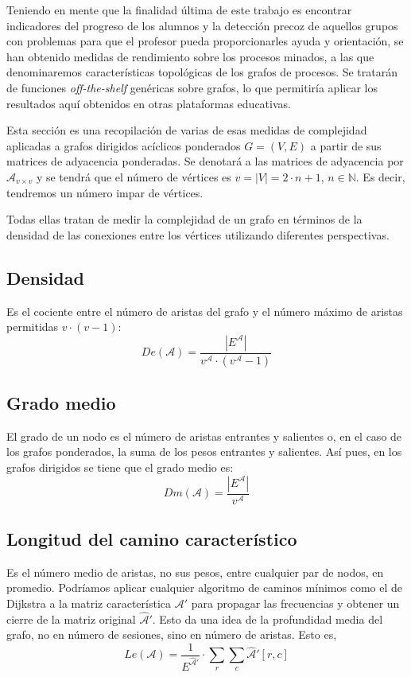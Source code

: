Teniendo en mente que la finalidad última de este trabajo es encontrar indicadores del progreso de los alumnos y la detección precoz de aquellos grupos con problemas para que el profesor pueda proporcionarles ayuda y orientación, se han obtenido medidas de rendimiento sobre los procesos minados, a las que denominaremos características topológicas de los grafos de procesos. Se tratarán de funciones \emph{off-the-shelf} genéricas sobre grafos, lo que permitiría aplicar los resultados aquí obtenidos en otras plataformas educativas.

Esta sección es una recopilación de varias de esas medidas de complejidad \cite{cormen2022introduction} aplicadas a grafos dirigidos acíclicos ponderados $G = (V,E)$ a partir de sus matrices de adyacencia ponderadas. Se denotará a las matrices de adyacencia por $\mathcal{A}_{v\times v}$ y se tendrá que el número de vértices es $v = |V| = 2\cdot n + 1$, $n \in \mathbb{N}$. Es decir, tendremos un número impar de vértices.

Todas ellas tratan de medir la complejidad de un grafo en términos de la densidad de las conexiones entre los vértices utilizando diferentes perspectivas.

\subsection{Densidad}
Es el cociente entre el número de aristas del grafo y el número máximo de aristas permitidas $v \cdot (v-1)$:
\begin{equation}
De(\mathcal{A}) = \frac{|E^{\mathcal{A}}|}{v^{\mathcal{A}}\cdot (v^{\mathcal{A}}-1)}
\end{equation}
\subsection{Grado medio}
El grado de un nodo es el número de aristas entrantes y salientes o, en el caso de los grafos ponderados, la suma de los pesos entrantes y salientes. Así pues, en los grafos dirigidos se tiene que el grado medio es:
\begin{equation}
Dm(\mathcal{A}) = \frac{|E^{\mathcal{A}}|}{v^{\mathcal{A}}}
\end{equation}
\subsection{Longitud del camino característico}
Es el número medio de aristas, no sus pesos, entre cualquier par de nodos, en promedio. Podríamos aplicar cualquier algoritmo de caminos mínimos como el de Dijkstra \cite{cormen2022introduction} a la matriz característica $\mathcal{A}'$ para propagar las frecuencias y obtener un cierre de la matriz original $\hat{\mathcal{A}}'$. Esto da una idea de la profundidad media del grafo, no en número de sesiones, sino en número de aristas. Esto es,
\begin{equation}
Le(\mathcal{A}) = \frac{1}{E^{\hat{\mathcal{A}}'}} \cdot \sum_r \sum_c \hat{\mathcal{A}}'[r,c]
\end{equation}
